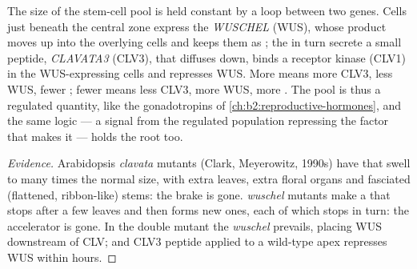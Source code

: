 \begin{proposition}\label{prop:b2:plant-meristems:wus}
The size of the stem-cell pool is held constant by a loop between
two genes. Cells just beneath the central zone express the
 \emph{WUSCHEL} (WUS), whose product moves up
into the overlying cells and keeps them as ; the  in turn secrete a small peptide, \emph{CLAVATA3} (CLV3), that
diffuses down, binds a receptor kinase (CLV1) in the WUS-expressing
cells and represses WUS. More  means more CLV3, less WUS,
fewer ; fewer  means less CLV3, more WUS, more
. The pool is thus a regulated quantity, like the
gonadotropins of \cref{ch:b2:reproductive-hormones}, and the same
logic --- a signal from the regulated population repressing the
factor that makes it --- holds the root  too.
\end{proposition}
\begin{proof}[Evidence]
Arabidopsis \emph{clavata} mutants (Clark, Meyerowitz, 1990s) have
 that swell to many times the normal size, with extra
leaves, extra floral organs and fasciated (flattened, ribbon-like)
stems: the brake is gone. \emph{wuschel} mutants make a 
that stops after a few leaves and then forms new ones, each of which
stops in turn: the accelerator is gone. In the double mutant the
\emph{wuschel}  prevails, placing WUS downstream of CLV;
and CLV3 peptide applied to a wild-type apex represses WUS within
hours.
\end{proof}

